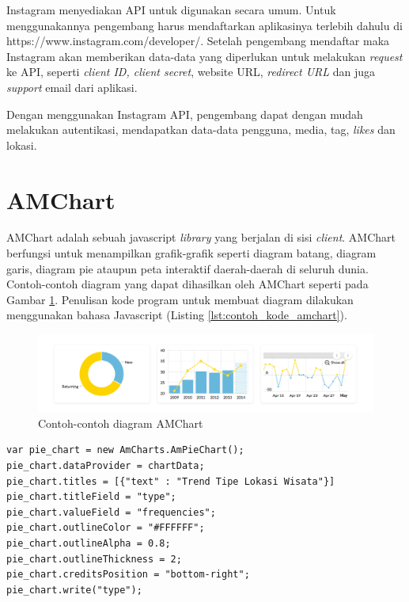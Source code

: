 Instagram menyediakan API untuk digunakan secara umum. Untuk menggunakannya pengembang harus mendaftarkan aplikasinya terlebih dahulu di https://www.instagram.com/developer/. Setelah pengembang mendaftar maka Instagram akan memberikan data-data yang diperlukan untuk melakukan \textit{request} ke API, seperti \textit{client ID, client secret}, website URL, \textit{redirect URL} dan juga \textit{support} email dari aplikasi.

Dengan menggunakan Instagram API, pengembang dapat dengan mudah melakukan autentikasi, mendapatkan data-data pengguna, media, tag, \textit{likes} dan lokasi. \cite{InstagramApi:2016}

\section{AMChart}
AMChart adalah sebuah javascript \textit{library} yang berjalan di sisi \textit{client}. AMChart berfungsi untuk menampilkan grafik-grafik seperti diagram batang, diagram garis, diagram pie ataupun peta interaktif daerah-daerah di seluruh dunia. Contoh-contoh diagram yang dapat dihasilkan oleh AMChart seperti pada Gambar \ref{fig:contoh_amchart}. Penulisan kode program untuk membuat diagram dilakukan menggunakan bahasa Javascript (Listing \ref{lst:contoh_kode_amchart}). 

\begin{figure}
	\centering
	\includegraphics[scale=0.3]{Gambar/contoh-amchart.png}
	\caption[Contoh-contoh diagram AMChart]{Contoh-contoh diagram AMChart\cite{AmCharts:2016}} 
	\label{fig:contoh_amchart}
\end{figure}

\begin{lstlisting}[basicstyle=\tiny,caption=Contoh Kode Diagram Pie di AMChart,label={lst:contoh_kode_amchart}]
var pie_chart = new AmCharts.AmPieChart();
pie_chart.dataProvider = chartData;
pie_chart.titles = [{"text" : "Trend Tipe Lokasi Wisata"}]
pie_chart.titleField = "type";
pie_chart.valueField = "frequencies";
pie_chart.outlineColor = "#FFFFFF";
pie_chart.outlineAlpha = 0.8;
pie_chart.outlineThickness = 2;
pie_chart.creditsPosition = "bottom-right";
pie_chart.write("type");
\end{lstlisting}


